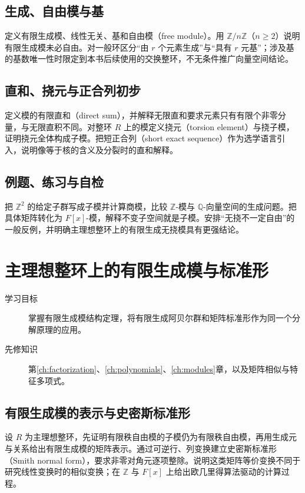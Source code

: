 \documentclass[UTF8,12pt,a4paper,fontset=fandol]{ctexbook}
\begin{document}
\section{生成、自由模与基}
定义有限生成模、线性无关、基和自由模（free module）。用 $\mathbb Z/n\mathbb Z$（$n\geq2$）说明有限生成模未必自由。对一般环区分“由 $r$ 个元素生成”与“具有 $r$ 元基”；涉及基的基数唯一性时限定到本书后续使用的交换整环，不无条件推广向量空间结论。

\section{直和、挠元与正合列初步}
定义模的有限直和（direct sum），并解释无限直和要求元素只有有限个非零分量，与无限直积不同。对整环 $R$ 上的模定义挠元（torsion element）与挠子模，证明挠元全体构成子模。把短正合列（short exact sequence）作为选学语言引入，说明像等于核的含义及分裂时的直和解释。

\section{例题、练习与自检}
把 $\mathbb Z^2$ 的给定子群写成子模并计算商模，比较 $\mathbb Z$-模与 $\mathbb Q$-向量空间的生成问题。把具体矩阵转化为 $F[x]$-模，解释不变子空间就是子模。安排“无挠不一定自由”的一般反例，并明确主理想整环上的有限生成无挠模具有更强结论。

\chapter{主理想整环上的有限生成模与标准形}\label{ch:pid-modules}

\begin{description}
  \item[学习目标] 掌握有限生成模结构定理，将有限生成阿贝尔群和矩阵标准形作为同一个分解原理的应用。
  \item[先修知识] 第\ref{ch:factorization}、\ref{ch:polynomials}、\ref{ch:modules}章，以及矩阵相似与特征多项式。
\end{description}

\section{有限生成模的表示与史密斯标准形}
设 $R$ 为主理想整环，先证明有限秩自由模的子模仍为有限秩自由模，再用生成元与关系给出有限生成模的矩阵表示。通过可逆行、列变换建立史密斯标准形（Smith normal form），要求非零对角元逐项整除。说明这类矩阵等价变换不同于研究线性变换时的相似变换；在 $\mathbb Z$ 与 $F[x]$ 上给出欧几里得算法驱动的计算过程。
\end{document}
